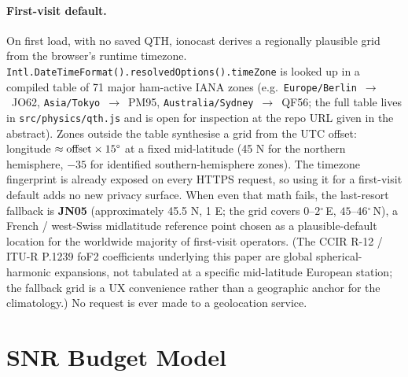 \documentclass[11pt,a4paper]{article}
\newcommand{\degree}{\ensuremath{{}^\circ}}
\begin{document}
\paragraph{First-visit default.}  On first load, with no saved QTH,
ionocast derives a regionally plausible grid from the browser's
runtime timezone.  \texttt{Intl.DateTimeFormat().resolvedOptions().timeZone}
is looked up in a compiled table of 71 major ham-active IANA
zones (e.g.\ \texttt{Europe/Berlin}~$\to$~JO62,
\texttt{Asia/Tokyo}~$\to$~PM95,
\texttt{Australia/Sydney}~$\to$~QF56; the full table lives in
\texttt{src/physics/qth.js} and is open for inspection at the repo
URL given in the abstract).  Zones outside the table
synthesise a grid from the UTC offset: longitude
$\approx \text{offset}\times 15\text{\textdegree}$ at a fixed
mid-latitude (45\textdegree{} N for the northern hemisphere,
$-35$\textdegree{} for identified southern-hemisphere zones).  The
timezone fingerprint is already exposed on every HTTPS request, so
using it for a first-visit default adds no new privacy surface.  When
even that math fails, the last-resort fallback is \textbf{JN05}
(approximately 45.5\textdegree{} N, 1\textdegree{} E; the grid
covers $0\text{--}2\degree$\,E, $45\text{--}46\degree$\,N), a
French / west-Swiss midlatitude reference point chosen as a
plausible-default location for the worldwide majority of
first-visit operators.  (The CCIR R-12 / ITU-R P.1239 foF2
coefficients underlying this paper are global spherical-harmonic
expansions, not tabulated at a specific mid-latitude European
station; the fallback grid is a UX convenience rather than a
geographic anchor for the climatology.)  No request is ever made
to a geolocation service.

\section{SNR Budget Model}\label{sec:snr}
\end{document}
